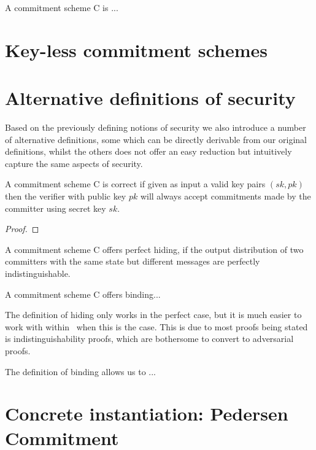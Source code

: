 \begin{definition}[Binding]
  A commitment scheme C is ...
\end{definition}



\section{Key-less commitment schemes}
\label{sec:commitment:key-less}

\section{Alternative definitions of security}
\label{sec:commitment:alt-sec}
Based on the previously defining notions of security we also introduce a number
of alternative definitions, some which can be directly derivable from our
original definitions, whilst the others does not offer an easy reduction but
intuitively capture the same aspects of security.

\begin{lemma}
  A commitment scheme C is correct if given as input a valid key pairs
  $(sk, pk)$ then the verifier with public key $pk$ will always accept
  commitments made by the committer using secret key $sk$.
\end{lemma}
\begin{proof}

\end{proof}

\begin{definition}
  \label{def:commitment:perfect-hiding}
  A commitment scheme C offers perfect hiding, if the output distribution of two
  committers with the same state but different messages are perfectly
  indistinguishable.

\end{definition}

\begin{definition}
  \label{def:commitment:alt-binding}
  A commitment scheme C offers binding...
\end{definition}

The definition of hiding only works in the perfect case, but it is much easier
to work with within \easycrypt\  when this is the case. This is due to most
proofs being stated is indistinguishability proofs, which are bothersome to
convert to adversarial proofs.

The definition of binding allows us to ...


\section{Concrete instantiation: Pedersen Commitment}
\label{sec:label}



